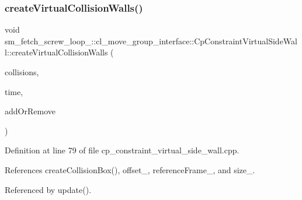 \subsubsection{\texorpdfstring{create\+Virtual\+Collision\+Walls()}{createVirtualCollisionWalls()}}
{\footnotesize\ttfamily void sm\+\_\+fetch\+\_\+screw\+\_\+loop\+\_\+::cl\+\_\+move\+\_\+group\+\_\+interface\+::\+Cp\+Constraint\+Virtual\+Side\+Wall\+::create\+Virtual\+Collision\+Walls (\begin{DoxyParamCaption}\item[{std\+::vector$<$ moveit\+\_\+msgs\+::\+Collision\+Object $>$ \&}]{collisions,  }\item[{const ros\+::\+Time \&}]{time,  }\item[{int}]{add\+Or\+Remove }\end{DoxyParamCaption})}



Definition at line 79 of file cp\+\_\+constraint\+\_\+virtual\+\_\+side\+\_\+wall.\+cpp.



References create\+Collision\+Box(), offset\+\_\+, reference\+Frame\+\_\+, and size\+\_\+.



Referenced by update().



